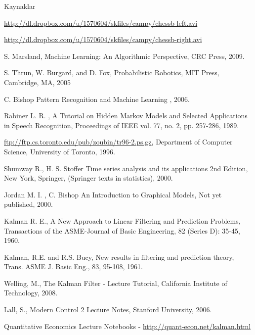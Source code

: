 \documentclass[12pt,fleqn]{article}\usepackage{../common}
\begin{document}
Kaynaklar

\url{http://dl.dropbox.com/u/1570604/skfiles/campy/chessb-left.avi}

\url{http://dl.dropbox.com/u/1570604/skfiles/campy/chessb-right.avi}

S. Marsland, Machine Learning: An Algorithmic Perspective, CRC Press,
2009.

S. Thrun, W. Burgard, and D. Fox, Probabilistic Robotics, MIT Press,
Cambridge, MA, 2005

C. Bishop Pattern Recognition and Machine Learning , 2006.

Rabiner L. R. , A Tutorial on Hidden Markov Models and Selected
Applications in Speech Recognition, Proceedings of IEEE vol. 77, no. 2,
pp. 257-286, 1989.

\url{ftp://ftp.cs.toronto.edu/pub/zoubin/tr96-2.ps.gz}, Department of
Computer Science, University of Toronto, 1996.

Shumway R., H. S. Stoffer Time series analysis and its applications 2nd
Edition, New York, Springer, (Springer texts in statistics), 2000. 

Jordan M. I. , C. Bishop An Introduction to Graphical Models, Not yet
published, 2000. 

Kalman R. E., A New Approach to Linear Filtering and Prediction Problems,
Transactions of the ASME-Journal of Basic Engineering, 82 (Series D):
35-45, 1960.

Kalman, R.E. and R.S. Bucy, New results in filtering and prediction theory,
Trans. ASME J. Basic Eng., 83, 95-108, 1961. 

Welling, M., The Kalman Filter - Lecture Tutorial, California Institute of
Technology, 2008. 

Lall, S., Modern Control 2 Lecture Notes, Stanford University, 2006.

Quantitative Economics Lecture Notebooks - \url{http://quant-econ.net/kalman.html}
\end{document}
